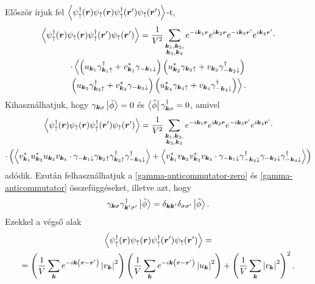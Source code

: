 \documentclass[a4paper,12pt,titlepage]{article}
\newcommand{\KK}{{\vb*{k}}}
\newcommand{\RR}{{\vb*{r}}}
\begin{document}
Először írjuk fel $\left< \psi_\uparrow^\dagger(\RR) \psi_\uparrow(\RR) \psi_\uparrow^\dagger(\RR^\prime) \psi_\uparrow(\RR^\prime) \right>$-t,
\begin{multline}
	\left< \psi_\uparrow^\dagger(\RR) \psi_\uparrow(\RR) \psi_\uparrow^\dagger(\RR^\prime) \psi_\uparrow(\RR^\prime) \right> = \frac{1}{V^2} \sum\limits_{\substack{\KK_1, \KK_2, \\ \KK_3, \KK_4}} e^{-i \KK_1 \RR} e^{i \KK_2 \RR} e^{-i \KK_3 \RR^\prime} e^{i \KK_4 \RR^\prime} \cdot \\
	\cdot \left< \left( u_{\KK_1} \gamma_{\KK_1 \uparrow}^\dagger + v_{\KK_1}^* \gamma_{-\KK_1 \downarrow} \right) \left( u_{\KK_2}^* \gamma_{\KK_2 \uparrow} + v_{\KK_2} \gamma_{-\KK_2 \downarrow}^\dagger \right)
	\right. \\ \left.
	\left( u_{\KK_3} \gamma_{\KK_3 \uparrow}^\dagger + v_{\KK_3}^* \gamma_{-\KK_3 \downarrow} \right) \left( u_{\KK_4}^* \gamma_{\KK_4 \uparrow} + v_{\KK_4} \gamma_{-\KK_4 \downarrow}^\dagger \right) \right>.
\end{multline}
Kihasználhatjuk, hogy $\gamma_{\KK \sigma} \ket{\tilde{\phi}} = 0$ és $\bra{\tilde{\phi}} \gamma_{\KK \sigma}^\dagger = 0$, amivel
\begin{multline}
	\left< \psi_\uparrow^\dagger(\RR) \psi_\uparrow(\RR) \psi_\uparrow^\dagger(\RR^\prime) \psi_\uparrow(\RR^\prime) \right> = \frac{1}{V^2} \sum\limits_{\substack{\KK_1, \KK_2, \\ \KK_3, \KK_4}} e^{-i \KK_1 \RR} e^{i \KK_2 \RR} e^{-i \KK_3 \RR^\prime} e^{i \KK_4 \RR^\prime} \cdot \\
	\cdot \left( \left< v_{\KK_1}^* u_{\KK_2}^* u_{\KK_3} v_{\KK_4} \cdot \gamma_{-\KK_1 \downarrow} \gamma_{\KK_2 \uparrow} \gamma_{\KK_3 \uparrow}^\dagger \gamma_{-\KK_4 \downarrow}^\dagger \right> + \left< v_{\KK_1}^* v_{\KK_2} v_{\KK_3}^* v_{\KK_4} \cdot \gamma_{-\KK_1 \downarrow} \gamma_{-\KK_4 \downarrow}^\dagger \gamma_{-\KK_3 \downarrow} \gamma_{-\KK_4 \downarrow}^\dagger \right> \right)
\end{multline}
adódik.  Ezután felhasználhatjuk a \eqref{gamma-anticommutator-zero} és \eqref{gamma-anticommutator} összefüggéseket, illetve azt, hogy
$$ \gamma_{\KK \sigma} \gamma_{\KK^\prime \sigma^\prime}^\dagger \ket{\tilde{\phi}} = \delta_{\KK \KK^\prime} \delta_{\sigma \sigma^\prime} \ket{\tilde{\phi}}. $$
Ezekkel a végső alak
\begin{multline}
	\left< \psi_\uparrow^\dagger(\RR) \psi_\uparrow(\RR) \psi_\uparrow^\dagger(\RR^\prime) \psi_\uparrow(\RR^\prime) \right> = \\
	= \left( \frac{1}{V} \sum\limits_\KK e^{-i \KK \left( \RR - \RR^\prime \right)} \left| v_\KK \right|^2 \right) \left( \frac{1}{V} \sum\limits_\KK e^{-i \KK \left( \RR - \RR^\prime \right)} \left| u_\KK \right|^2 \right) + \left( \frac{1}{V} \sum\limits_\KK \left| v_\KK \right|^2 \right)^2.
\end{multline}
\end{document}

